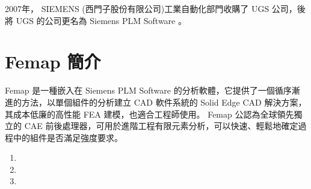 2007年， SIEMENS (西門子股份有限公司)工業自動化部門收購了 UGS 公司，後將 UGS 的公司更名為 Siemens PLM Software 。 \\
\section{ Femap 簡介}
 Femap 是一種嵌入在 Siemens PLM Software 的分析軟體，它提供了一個循序漸進的方法，以單個組件的分析建立 CAD 軟件系統的 Solid Edge CAD 解決方案，其成本低廉的高性能 FEA 建模，也適合工程師使用。 Femap 公認為全球領先獨立的 CAE 前後處理器，可用於進階工程有限元素分析，可以快速、輕鬆地確定過程中的組件是否滿足強度要求。 \\
 
\begin{enumerate}
\item 
\item 
\item 
\end{enumerate}

\renewcommand{\baselinestretch}{0.5} %
